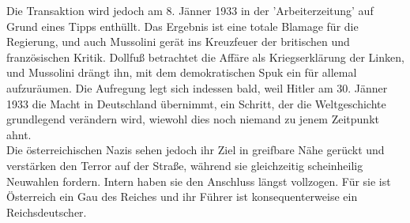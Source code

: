 \documentclass[letterpaper, 12pt]{article}
\begin{document}
Die Transaktion wird jedoch am 8. Jänner 1933 in der 'Arbeiterzeitung' auf Grund eines Tipps enthüllt. Das Ergebnis ist eine totale Blamage für die Regierung, und auch Mussolini gerät ins Kreuzfeuer der britischen und französischen Kritik. Dollfuß betrachtet die Affäre als Kriegserklärung der Linken, und Mussolini drängt ihn, mit dem demokratischen Spuk ein für allemal aufzuräumen. \clearpage
Die Aufregung legt sich indessen bald, weil Hitler am 30. Jänner 1933 die Macht in Deutschland übernimmt, ein Schritt, der die Weltgeschichte grundlegend verändern wird, wiewohl dies noch niemand zu jenem Zeitpunkt ahnt. \\
Die österreichischen Nazis sehen jedoch ihr Ziel in greifbare Nähe gerückt und verstärken den Terror auf der Straße, während sie gleichzeitig scheinheilig Neuwahlen fordern. Intern haben sie den Anschluss längst vollzogen. Für sie ist Österreich ein Gau des Reiches und ihr Führer ist konsequenterweise ein Reichsdeutscher.
\end{document}
